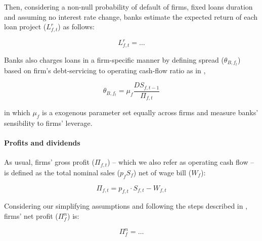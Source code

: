 \documentclass{SelfArx}
\begin{document}
Then, considering a non-null probability of default of firms, fixed loans duration and assuming no interest rate change, banks estimate the expected return of each loan project (\(L^{r}_{f,t}\)) as follows:
\begin{latex}
\begin{equation}
L^{r}_{f,t} = \ldots
\end{equation}
\end{latex}

Banks also charges loans in a firm-specific manner by defining spread (\(\theta_{B,f_{t}}\)) based on firm's debt-servicing to operating cash-flow ratio as in \textcite{pedrosa_2021_What,reissl_2020_Minsky},
\begin{latex}
\begin{equation}
\theta_{B,f_{t}} = \mu_{f}\frac{DS_{f,t-1}}{\Pi_{f,t}}
\end{equation}
\end{latex}
in which \(\mu_{f}\) is a exogenous parameter set equally across firms and measure banks' sensibility to firms' leverage.

\paragraph*{Profits and dividends}
\label{sec:org3b1ba89}

As usual, firms' gross profit (\(\Pi_{f,t}\)) -- which we also refer as operating cash flow -- is defined as the total nominal sales (\(p_{f}S_{f}\)) net of wage bill (\(W_{f}\)):

\begin{latex}
\begin{equation}
\Pi_{f,t} = p_{f,t}\cdot S_{f,t} - W_{f,t}
\end{equation}
\end{latex}
Considering our simplifying assumptions and following the steps described in \textcite{pedrosa_2021_What}, firms' net profit (\(\Pi^{n}_{f}\)) is:

\begin{latex}
\begin{equation}
\Pi^{n}_{f} = \ldots
\end{equation}
\end{latex}
\end{document}
